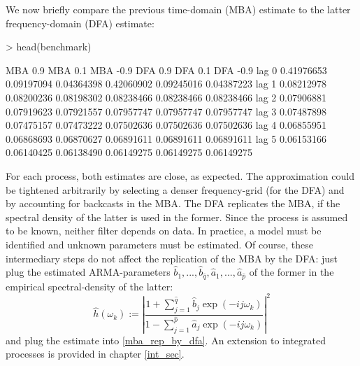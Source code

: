 \documentclass[a4paper]{book}
\begin{document}
\begin{Schunk}
\end{Schunk}
We now briefly compare the previous time-domain (MBA) estimate to the latter frequency-domain (DFA) estimate:
\begin{Schunk}
\begin{Sinput}
> head(benchmark)
\end{Sinput}
\begin{Soutput}
         MBA 0.9    MBA 0.1   MBA -0.9    DFA 0.9    DFA 0.1   DFA -0.9
lag 0 0.41976653 0.09197094 0.04364398 0.42060902 0.09245016 0.04387223
lag 1 0.08212978 0.08200236 0.08198302 0.08238466 0.08238466 0.08238466
lag 2 0.07906881 0.07919623 0.07921557 0.07957747 0.07957747 0.07957747
lag 3 0.07487898 0.07475157 0.07473222 0.07502636 0.07502636 0.07502636
lag 4 0.06855951 0.06868693 0.06870627 0.06891611 0.06891611 0.06891611
lag 5 0.06153166 0.06140425 0.06138490 0.06149275 0.06149275 0.06149275
\end{Soutput}
\end{Schunk}
For each process, both estimates are close, as expected. The approximation could be tightened arbitrarily by selecting a denser frequency-grid (for the DFA) and by accounting for backcasts in the MBA. The DFA replicates the MBA, if the spectral density of the latter is used in the former. Since the process is assumed to be known, neither filter depends on data. In practice, a model must be identified and unknown parameters must be estimated. Of course, these intermediary steps do not affect the replication of the MBA by the DFA: just plug the estimated ARMA-parameters $\hat{b}_1,...,\hat{b}_{\hat{q}},\hat{a}_1,...,\hat{a}_{\hat{p}}$ of the former in the empirical spectral-density of the latter:
\[\hat{h}(\omega_k):=\left|\frac{1+\sum_{j=1}^{\hat{q}}\hat{b}_j\exp(-ij\omega_k)}{1-\sum_{j=1}^{\hat{p}}\hat{a}_j\exp(-ij\omega_k)}\right|^2\]
and plug the estimate into \ref{mba_rep_by_dfa}. An extension to integrated processes is provided in chapter \ref{int_sec}.
\end{document}
